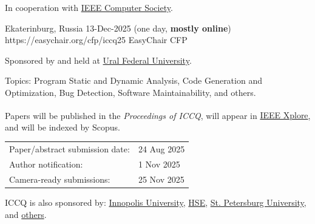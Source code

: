 \documentclass{../cfp}
\begin{document}
\PrintLogo{}



In cooperation
with
\href{https://conferences.ieee.org/conferences_events/conferences/conferencedetails/53703}{IEEE Computer Society}.

\vspace{6pt}

\PrintAddress
  {Ekaterinburg, Russia}
  {13-Dec-2025 (one day, \textbf{mostly online})}
  {https://easychair.org/cfp/iccq25}
  {EasyChair CFP}

\vspace{12pt}
%
\vspace{12pt}

Sponsored by and held at \href{https://urfu.ru/}{Ural Federal University}.

Topics: Program Static and Dynamic Analysis,
Code Generation and Optimization,
Bug Detection, Software Maintainability, and others.

Papers will be published in the \textit{Proceedings of ICCQ},
will appear in \href{https://ieeexplore.ieee.org/Xplore/home.jsp}{IEEE Xplore\textsuperscript{\textregistered}},
and will be indexed by Scopus.

\begin{tabular}{@{}ll}
Paper/abstract submission date: & 24 Aug 2025 \\
Author notification: & 1 Nov 2025 \\
Camera-ready submissions: & 25 Nov 2025
\end{tabular}

\vspace{6pt}
ICCQ is also sponsored by:
\href{https://innopolis.university/}{Innopolis University},
\href{https://hse.ru/}{HSE},
\href{https://english.spbu.ru/}{St. Petersburg University},
and \href{https://www.iccq.ru/2025.html#partners}{others}.
\end{document}
